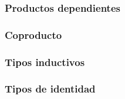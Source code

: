 \documentclass{article}
\begin{document}
    \subsubsection{Productos dependientes}
    \subsubsection{Coproducto}
    \subsubsection{Tipos inductivos}
    
    \subsubsection{Tipos de identidad}
\end{document}
